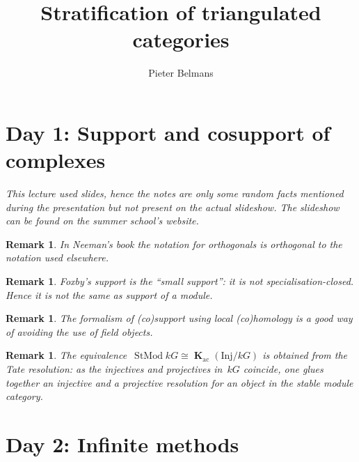 \documentclass[10pt,a4paper]{article}
\title{Stratification of triangulated categories}
\author{Pieter Belmans}
\theoremstyle{lecture}
\newtheorem{remark}[theorem]{Remark}
\newcommand\ac{\ensuremath{\mathrm{ac}}}
\newcommand\Inj{\ensuremath{\mathrm{Inj}}}
\DeclareMathOperator\KKK{\mathbf{K}}
\DeclareMathOperator\StMod{StMod}
\begin{document}
\maketitle

\tableofcontents

\clearpage

\section{Day 1: Support and cosupport of complexes}
\emph{This lecture used slides, hence the notes are only some random facts mentioned during the presentation but not present on the actual slideshow. The slideshow can be found on the summer school's website.}

\begin{remark}
  In Neeman's book the notation for orthogonals is orthogonal to the notation used elsewhere.
\end{remark}
\begin{remark}
  Foxby's support is the ``small support'': it is not specialisation-closed. Hence it is not the same as support of a module.
\end{remark}
\begin{remark}
  The formalism of (co)support using local (co)homology is a good way of avoiding the use of field objects.
\end{remark}
\begin{remark}
  The equivalence~$\StMod kG\cong\KKK_\ac(\Inj/kG)$ is obtained from the \emph{Tate resolution}: as the injectives and projectives in~$kG$ coincide, one glues together an injective and a projective resolution for an object in the stable module category.
\end{remark}


\section{Day 2: Infinite methods}
\end{document}

